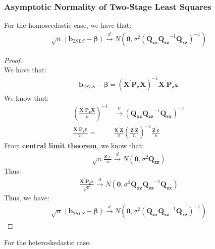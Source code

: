 \documentclass{article}
\begin{document}
\subsubsection{Asymptotic Normality of Two-Stage Least Squares}
For the homoscedastic case, we have that:
	\begin{align*}
		\sqrt{n}(\boldsymbol{b}_{2SLS} - \boldsymbol{\beta}) \xrightarrow{d} N(\boldsymbol{0}, \sigma^2 (\boldsymbol{Q_{zx}} \boldsymbol{Q_{zz}}^{-1} \boldsymbol{Q_{xz}})^{-1})
	\end{align*}
	\begin{proof}
		\mbox{}\\
		We have that:
			\begin{align*}
				\boldsymbol{b}_{2SLS} - \boldsymbol{\beta} = (\boldsymbol{X}^\prime \boldsymbol{P_z} \boldsymbol{X})^{-1} \boldsymbol{X}^\prime \boldsymbol{P_z} \boldsymbol{\varepsilon}
			\end{align*}
		We know that:
			\begin{align*}
				\left( \frac{\boldsymbol{X}^\prime \boldsymbol{P_z} \boldsymbol{X}}{n} \right)^{-1} &  \xrightarrow{p} (\boldsymbol{Q_{xz}} \boldsymbol{Q_{zz}}^{-1} \boldsymbol{Q_{zx}})^{-1}\\
				\frac{\boldsymbol{X}^\prime \boldsymbol{P_z} \boldsymbol{\varepsilon}}{n} = &\frac{\boldsymbol{X}^\prime \boldsymbol{Z}}{n} \left( \frac{\boldsymbol{Z}^\prime \boldsymbol{Z}}{n} \right)^{-1} \frac{\boldsymbol{Z}^\prime \boldsymbol{\varepsilon}}{n}
			\end{align*}
		From \textbf{central limit theorem}, we know that:
			\begin{align*}
				\sqrt{n}\frac{\boldsymbol{Z}^\prime \boldsymbol{\varepsilon}}{n} \xrightarrow{d} N(\boldsymbol{0}, \sigma^2 \boldsymbol{Q_{zz}})
			\end{align*}
		Thus:
			\begin{align*}
				\frac{\boldsymbol{X}^\prime \boldsymbol{P_z} \boldsymbol{\varepsilon}}{\sqrt{n}} \xrightarrow{d} N(\boldsymbol{0}, \sigma^2 \boldsymbol{Q_{xz}} \boldsymbol{Q_{zz}}^{-1} \boldsymbol{Q_{zx}})
			\end{align*}
		Thus, we have:
			\begin{align*}
				\sqrt{n}(\boldsymbol{b}_{2SLS} - \boldsymbol{\beta}) \xrightarrow{d} N(\boldsymbol{0}, \sigma^2 (\boldsymbol{Q_{zx}} \boldsymbol{Q_{zz}}^{-1} \boldsymbol{Q_{xz}})^{-1})
			\end{align*}
	\end{proof}
\noindent For the heteroskedastic case:\\
\end{document}
